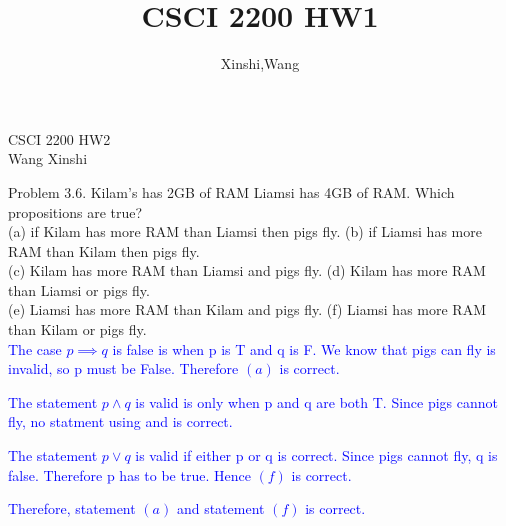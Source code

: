\documentclass{article}
\title{CSCI 2200 HW1}
\author{Xinshi,Wang}
\begin{document}
\noindent
CSCI 2200 HW2\\
Wang Xinshi\\

\begin{addmargin}[2em]{2em}
	Problem 3.6. Kilam’s has 2GB of RAM Liamsi has 4GB of RAM. Which propositions are true? \\
	\indent (a) if Kilam has more RAM than Liamsi then pigs ﬂy. (b) if Liamsi has more RAM than Kilam then pigs ﬂy. \\
	\indent (c) Kilam has more RAM than Liamsi and pigs ﬂy. (d) Kilam has more RAM than Liamsi or pigs ﬂy.\\
	\indent (e) Liamsi has more RAM than Kilam and pigs ﬂy. (f) Liamsi has more RAM than Kilam or pigs ﬂy.\\
	
	\textcolor{blue}{
		The case $p \implies q$ is false is when p is T and q is F. We know that pigs can fly is invalid, so p must be False. Therefore $(a)$ is correct.}
	
	\textcolor{blue}{
		The statement $p \land q$ is valid is only when p and q are both T. Since pigs cannot fly, no statment using and is correct.}
	
	\textcolor{blue}{
		The statement $p \lor q$ is valid if either p or q is correct. Since pigs cannot fly, q is false. Therefore p has to be true. Hence $(f)$ is correct.
	}

	\textcolor{blue} {
		Therefore, statement $(a)$ and statement $(f)$ is correct.
	}

\end{addmargin}

\clearpage
\end{document}
